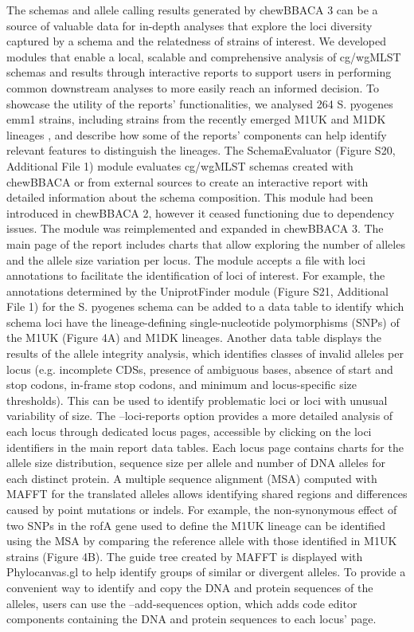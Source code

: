 The schemas and allele calling results generated by chewBBACA 3 can be a source of valuable data for in-depth analyses that explore the loci diversity captured by a schema and the relatedness of strains of interest. We developed modules that enable a local, scalable and comprehensive analysis of cg/wgMLST schemas and results through interactive reports to support users in performing common downstream analyses to more easily reach an informed decision. To showcase the utility of the reports' functionalities, we analysed 264 S. pyogenes emm1 strains, including strains from the recently emerged M1UK and M1DK lineages \citep{lynskey_emergence_2019, johannesen_increase_2023}, and describe how some of the reports’ components can help identify relevant features to distinguish the lineages.
The SchemaEvaluator (Figure S20, Additional File 1) module evaluates cg/wgMLST schemas created with chewBBACA or from external sources to create an interactive report with detailed information about the schema composition. This module had been introduced in chewBBACA 2, however it ceased functioning due to dependency issues. The module was reimplemented and expanded in chewBBACA 3. The main page of the report includes charts that allow exploring the number of alleles and the allele size variation per locus. The module accepts a file with loci annotations to facilitate the identification of loci of interest. For example, the annotations determined by the UniprotFinder module (Figure S21, Additional File 1) for the S. pyogenes schema can be added to a data table to identify which schema loci have the lineage-defining single-nucleotide polymorphisms (SNPs) of the M1UK (Figure 4A) and M1DK lineages. Another data table displays the results of the allele integrity analysis, which identifies classes of invalid alleles per locus (e.g. incomplete CDSs, presence of ambiguous bases, absence of start and stop codons, in-frame stop codons, and minimum and locus-specific size thresholds). This can be used to identify problematic loci or loci with unusual variability of size. The --loci-reports option provides a more detailed analysis of each locus through dedicated locus pages, accessible by clicking on the loci identifiers in the main report data tables. Each locus page contains charts for the allele size distribution, sequence size per allele and number of DNA alleles for each distinct protein. A multiple sequence alignment (MSA) computed with MAFFT \citep{katoh_mafft_2013} for the translated alleles allows identifying shared regions and differences caused by point mutations or indels. For example, the non-synonymous effect of two SNPs in the rofA gene used to define the M1UK lineage can be identified using the MSA by comparing the reference allele with those identified in M1UK strains (Figure 4B). The guide tree created by MAFFT is displayed with Phylocanvas.gl \citep{abudahab_phylocanvasgl_2021} to help identify groups of similar or divergent alleles. To provide a convenient way to identify and copy the DNA and protein sequences of the alleles, users can use the --add-sequences option, which adds code editor components containing the DNA and protein sequences to each locus’ page.
